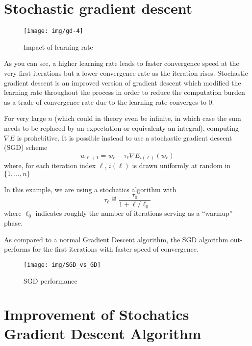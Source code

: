 \documentclass[
  a4paper]{article}
\begin{document}
\hypertarget{stochastic-gradient-descent}{%
\section{Stochastic gradient descent}\label{stochastic-gradient-descent}}

\begin{figure}

{\centering \texttt{[image: img/gd-4]} 

}

\caption{Impact of learning rate}\label{fig:unnamed-chunk-2}
\end{figure}

As you can see, a higher learning rate leads to faster convergence speed at the very first iterations but a lower convergence rate as the iteration rises. Stochastic gradient descent is an improved version of gradient descent which modified the learning rate throughout the process in order to reduce the computation burden as a trade of convergence rate due to the learning rate converges to \(0\).

For very large \(n\) (which could in theory even be infinite, in which case the sum needs to be replaced
by an expectation or equivalenty an integral), computing \(\nabla E\) is prohebitive.
It is possible instead to use a stochastic gradient descent (SGD) scheme
\[ w_{\ell+1} = w_\ell - \tau_\ell \nabla E_{i(\ell)}(w_\ell) \]
where, for each iteration index \(\ell\), \(i(\ell)\)
is drawn uniformly at random in \(\{1,\ldots,n\}\)

In this example, we are using a stochatics algorithm with \[ \tau_\ell \eqdef \frac{\tau_0}{1 + \ell/\ell_0} \]
where \(\ell_0\) indicates roughly the number of iterations serving as a
``warmup'' phase.

As compared to a normal Gradient Descent algorithm, the SGD algorithm out-performs for the first iterations with faster speed of convergence.

\begin{figure}

{\centering \texttt{[image: img/SGD\_vs\_GD]} 

}

\caption{SGD performance}\label{fig:unnamed-chunk-3}
\end{figure}

\hypertarget{improvement-of-stochatics-gradient-descent-algorithm}{%
\section{Improvement of Stochatics Gradient Descent Algorithm}\label{improvement-of-stochatics-gradient-descent-algorithm}}
\end{document}
